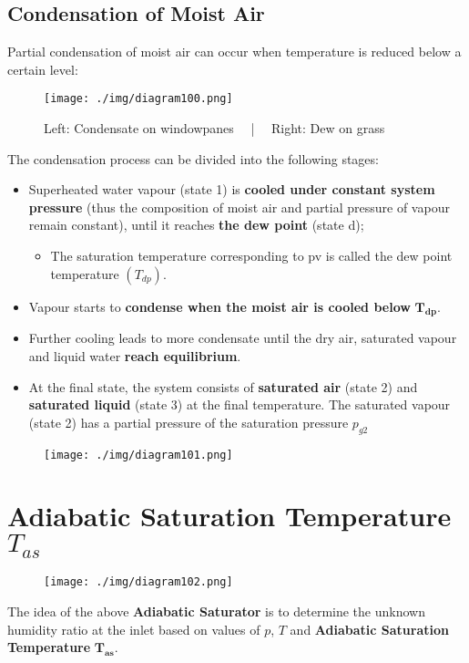 \subsection{Condensation of Moist Air}
Partial condensation of moist air can occur when temperature is reduced below a certain level:
\begin{figure}[H]
  \centering
  \texttt{[image: ./img/diagram100.png]}
  \caption{Left: Condensate on windowpanes \ \ | \ \ Right: Dew on grass}
\end{figure}
The condensation process can be divided into the following stages:
\begin{itemize}[noitemsep]
  \item Superheated water vapour (state 1) is \textbf{cooled under constant system pressure} (thus the composition of moist air and partial pressure of vapour remain constant), until it reaches \textbf{the dew point} (state d);
        \begin{itemize}[noitemsep]
          \item The saturation temperature corresponding to pv is called the dew point temperature $(T_{dp})$.
        \end{itemize}
  \item Vapour starts to \textbf{condense when the moist air is cooled below} $\mathbf{T_{dp}}$.
  \item Further cooling leads to more condensate until the dry air, saturated vapour and liquid water \textbf{reach equilibrium}.
  \item At the final state, the system consists of \textbf{saturated air} (state 2) and \textbf{saturated liquid} (state 3) at the final temperature. The saturated vapour (state 2) has a partial pressure of the saturation pressure $p_{g2}$
\end{itemize}
\begin{figure}[H]
  \centering
  \texttt{[image: ./img/diagram101.png]}
  \caption{}
\end{figure}
\section{Adiabatic Saturation Temperature $T_{as}$}
\begin{figure}[H]
  \centering
  \texttt{[image: ./img/diagram102.png]}
  \caption{}
\end{figure}
The idea of the above \textbf{Adiabatic Saturator} is to determine the unknown humidity ratio at the inlet based on values of $p$, $T$ and \textbf{Adiabatic Saturation Temperature} $\mathbf{T_{as}}$.
